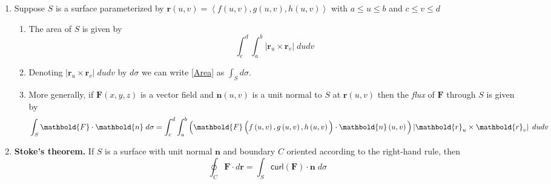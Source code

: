 \documentclass[12pt]{article}
\begin{document}
\begin{enumerate}
\item Suppose $S$ is a surface parameterized by
$\mathbold{r}\left(u,v\right)
=\left\langle f\left(u,v\right),g\left(u,v\right),h\left(u,v\right)
\right\rangle$ with $a\le u\le b$ and $c\le v\le d$
\begin{enumerate}
\item The area of $S$ is given by
\begin{equation}\label{Area}
\int_c^d\int_a^b\left|\mathbold{r}_u\times\mathbold{r}_v
\right|\;dudv
\end{equation}
\item Denoting $\left|\mathbold{r}_u\times\mathbold{r}_v\right|\;dudv$
by $d\sigma$ we can write \autoref{Area} as
$\int_Sd\sigma$.
\item More generally, if $\mathbold{F}\left(x,y,z\right)$
is a vector field and $\mathbold{n}\left(u,v\right)$
is a unit normal to $S$ at $\mathbold{r}\left(u,v\right)$
then the {\em flux} of $\mathbold{F}$ through $S$
is given by
\[\int_S\mathbold{F}\cdot\mathbold{n}\;d\sigma
=\int_c^d\int_a^b\left(
\mathbold{F}\left(f\left(u,v\right),g\left(u,v\right),
h\left(u,v\right)\rule{0pt}{11pt}\right)
\cdot\mathbold{n}\left(u,v\right)\rule{0pt}{12pt}\right)
\left|\mathbold{r}_u\times\mathbold{r}_v
\right|\;dudv\]
\end{enumerate}

\item{\bf Stoke's theorem.}
If $S$ is a surface with unit normal $\mathbold{n}$
and boundary $C$ oriented according to the right-hand rule, then
\[\oint_C\mathbold{F}\cdot d\mathbold{r}
=\int_S\mathsf{curl}\left(\mathbold{F}\right)
\cdot\mathbold{n}\;d\sigma\]
\end{enumerate}
\end{document}
